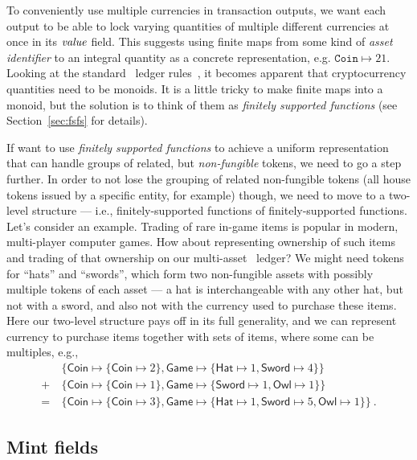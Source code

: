 To conveniently use multiple currencies in transaction outputs, we want each output to be able to lock varying quantities of multiple different currencies at once in its $\mathit{value}$ field.
This suggests using finite maps from some kind of \emph{asset identifier} to an integral quantity as a concrete representation, e.g. $\texttt{Coin} \mapsto 21$.
Looking at the standard \UTXO\ ledger rules~\cite{Zahnentferner18-UTxO}, it becomes apparent that cryptocurrency quantities need to be monoids.
It is a little tricky to make finite maps into a monoid, but the solution is to think of them as \emph{finitely supported functions} (see Section~\ref{sec:fsfs} for details).

If want to use \emph{finitely supported functions} to achieve a uniform
representation that can handle groups of related, but \emph{non-fungible} tokens, we need to go a step further.
In order to not lose the grouping of related non-fungible tokens (all house tokens issued by a specific entity, for example) though, we need to move to a two-level structure --- i.e., finitely-supported functions of finitely-supported functions. Let's consider an example. Trading of rare in-game items is popular in modern, multi-player computer games. How about representing ownership of such items and trading of that ownership on our multi-asset \UTXO\ ledger? We might need tokens for ``hats'' and ``swords'', which form two non-fungible assets with possibly multiple tokens of each asset --- a hat is interchangeable with any other hat, but not with a sword, and also not with the currency used to purchase these
items. Here our two-level structure pays off in its full generality, and we can represent currency to purchase items together with sets of items, where some can be multiples, e.g.,
%
\begin{align*}
  & \{\mathsf{Coin} \mapsto \{\mathsf{Coin} \mapsto 2\}, \mathsf{Game} \mapsto \{\mathsf{Hat} \mapsto 1, \mathsf{Sword} \mapsto 4\}\} \\
  + \ & \{\mathsf{Coin} \mapsto \{\mathsf{Coin} \mapsto 1\}, \mathsf{Game} \mapsto \{\mathsf{Sword} \mapsto 1, \mathsf{Owl} \mapsto 1\}\} \\
  = \ & \{\mathsf{Coin} \mapsto \{\mathsf{Coin} \mapsto 3\}, \mathsf{Game} \mapsto \{\mathsf{Hat} \mapsto 1, \mathsf{Sword} \mapsto 5, \mathsf{Owl} \mapsto 1\}\} \ .
\end{align*}

\subsection{Mint fields}

